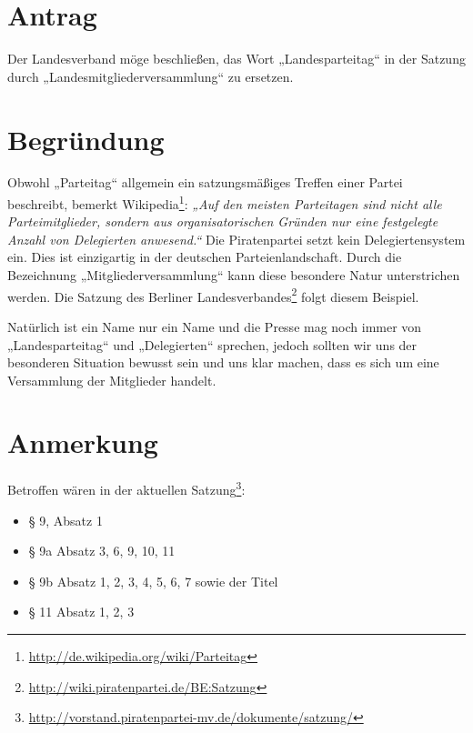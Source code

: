 \section{Antrag}

Der Landesverband möge beschließen, das Wort „Landesparteitag`` in der Satzung durch „Landesmitgliederversammlung`` zu ersetzen.

\section{Begründung}

Obwohl „Parteitag`` allgemein ein satzungsmäßiges Treffen einer Partei beschreibt, bemerkt Wikipedia\footnote{\url{http://de.wikipedia.org/wiki/Parteitag}}: \emph{„Auf den meisten Parteitagen sind nicht alle Parteimitglieder, sondern aus organisatorischen Gründen nur eine festgelegte Anzahl von Delegierten anwesend.``} Die Piratenpartei setzt kein Delegiertensystem ein. Dies ist einzigartig in der deutschen Parteienlandschaft. Durch die Bezeichnung „Mitgliederversammlung`` kann diese besondere Natur unterstrichen werden. Die Satzung des Berliner Landesverbandes\footnote{\url{http://wiki.piratenpartei.de/BE:Satzung}} folgt diesem Beispiel.

Natürlich ist ein Name nur ein Name und die Presse mag noch immer von „Landesparteitag`` und „Delegierten`` sprechen, jedoch sollten wir uns der besonderen Situation bewusst sein und uns klar machen, dass es sich um eine Versammlung der Mitglieder handelt.

\section{Anmerkung}

Betroffen wären in der aktuellen Satzung\footnote{\url{http://vorstand.piratenpartei-mv.de/dokumente/satzung/}}:

\begin{itemize}
\item
  § 9, Absatz 1
\item
  § 9a Absatz 3, 6, 9, 10, 11
\item
  § 9b Absatz 1, 2, 3, 4, 5, 6, 7 sowie der Titel
\item
  § 11 Absatz 1, 2, 3
\end{itemize}
